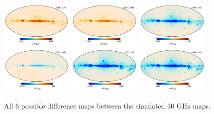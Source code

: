\documentclass{aa}
\begin{document}
\begin{figure}
\includegraphics[width=0.31\textwidth]{figs/sim_27M_minus_27S.pdf} 
\includegraphics[width=0.31\textwidth]{figs/sim_27M_minus_28M.pdf} 
\includegraphics[width=0.31\textwidth]{figs/sim_27M_minus_28S.pdf}\\
\includegraphics[width=0.31\textwidth]{figs/sim_27S_minus_28M.pdf} 
\includegraphics[width=0.31\textwidth]{figs/sim_27S_minus_28S.pdf}
\includegraphics[width=0.31\textwidth]{figs/sim_28M_minus_28S.pdf}
\caption{All 6 possible difference maps between the simulated 30 GHz maps. 
	} \label{fig:sim_bp_diffs}
\end{figure}
\end{document}

